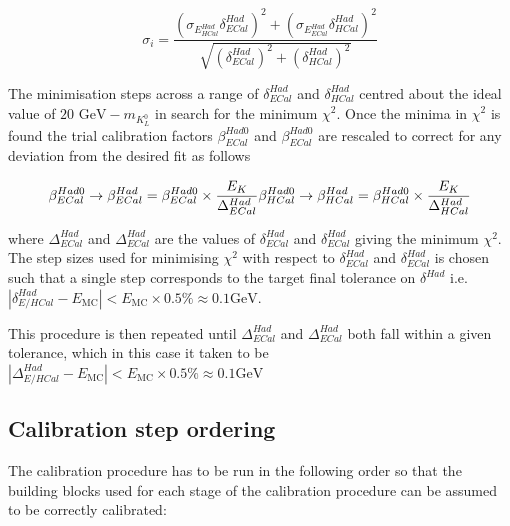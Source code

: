 \begin{equation}
\sigma_{i} = \frac{(\sigma_{E^{Had}_{HCal}}  \delta^{Had}_{ECal})^{2} + (\sigma_{E^{Had}_{ECal}} \delta^{Had}_{HCal})^{2}}{\sqrt{(\delta^{Had}_{ECal})^{2} + (\delta^{Had}_{HCal})^{2}}}
\label{equ:sigmaxicalc}
\end{equation}

The minimisation steps across a range of $\delta^{Had}_{ECal}$ and $\delta^{Had}_{HCal}$ centred about the ideal value of $20 \text { GeV} - m_{K^{0}_{L}}$ in search for the minimum $\chi^{2}$.  Once the minima in $\chi^{2}$ is found the trial calibration factors $\beta^{Had0}_{ECal}$ and $\beta^{Had0}_{ECal}$ are rescaled to correct for any deviation from the desired fit as follows

\begin{equation}
\beta^{Had0}_{ECal} \rightarrow \beta^{Had}_{ECal} = \beta^{Had0}_{ECal} \times \frac{E_{K}}{\Delta^{Had}_{ECal}} \\
\beta^{Had0}_{HCal} \rightarrow \beta^{Had}_{HCal} = \beta^{Had0}_{HCal} \times \frac{E_{K}}{\Delta^{Had}_{HCal}}
\end{equation}

where $\Delta^{Had}_{ECal}$ and $\Delta^{Had}_{ECal}$ are the values of $\delta^{Had}_{ECal}$ and $\delta^{Had}_{ECal}$ giving the minimum $\chi^{2}$.  The step sizes used for minimising $\chi^{2}$ with respect to $\delta^{Had}_{ECal}$ and $\delta^{Had}_{ECal}$ is chosen such that a single step corresponds to the target final tolerance on $\delta^{Had}$ i.e. $|\delta^{Had}_{E/HCal} - E_{\text{MC}}| < E_{\text{MC}} \times 0.5 \% \approx 0.1 \text{GeV}$.  

This procedure is then repeated until $\Delta^{Had}_{ECal}$ and $\Delta^{Had}_{ECal}$ both fall within a given tolerance, which in this case it taken to be $|\Delta^{Had}_{E/HCal} - E_{\text{MC}}| < E_{\text{MC}} \times 0.5 \% \approx 0.1 \text{GeV}$


\subsection{Calibration step ordering}
\label{sec:orderingcalib}

The calibration procedure has to be run in the following order so that the building blocks used for each stage of the calibration procedure can be assumed to be correctly calibrated:

